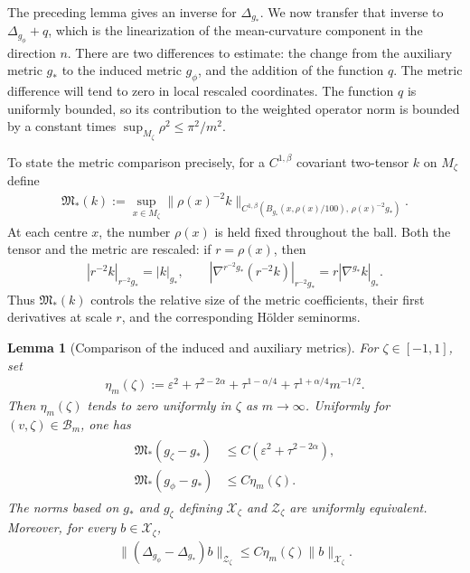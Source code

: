 \documentclass[a4paper,11pt,oneside,reqno]{amsart}
\numberwithin{equation}{section}
\newtheorem{lemma}[theorem]{Lemma}
\theoremstyle{definition}
\begin{document}
The preceding lemma gives an inverse for $\Delta_{g_*}$.
We now transfer that inverse to
$\Delta_{g_\phi}+q$, which is the linearization of the
mean-curvature component in the direction $n$.
There are two differences to estimate: the change from the
auxiliary metric $g_*$ to the induced metric $g_\phi$, and
the addition of the function $q$. The metric difference
will tend to zero in local rescaled coordinates. The
function $q$ is uniformly bounded, so its contribution to
the weighted operator norm is bounded by a constant times
$\sup_{M_\zeta}\rho^2\leq\pi^2/m^2$.

To state the metric comparison precisely, for a
$C^{1,\beta}$ covariant two-tensor $k$ on $M_\zeta$ define
%
\begin{align}
    \label{eq:s4-metric-comparison-norm}
    \mathfrak{M}_*(k)
    :=\sup_{x\in M_\zeta}
    \|\rho(x)^{-2}k\|_{C^{1,\beta}
    (B_{g_*}(x,\rho(x)/100),\,\rho(x)^{-2}g_*)}.
\end{align}
%
At each centre $x$, the number $\rho(x)$ is held fixed
throughout the ball. Both the tensor and the metric are
rescaled: if $r=\rho(x)$, then
%
\begin{align*}
    |r^{-2}k|_{r^{-2}g_*}=|k|_{g_*},
    \qquad
    |\nabla^{r^{-2}g_*}(r^{-2}k)|_{r^{-2}g_*}
    =r|\nabla^{g_*}k|_{g_*}.
\end{align*}
%
Thus $\mathfrak M_*(k)$ controls the relative size of the
metric coefficients, their first derivatives at scale $r$,
and the corresponding H\"older seminorms.

\begin{lemma}[Comparison of the induced and auxiliary metrics]
    \label{lem:s4-metric-comparison}
    For $\zeta\in[-1,1]$, set
    \begin{align}
        \label{eq:s4-comparison-smallness}
        \eta_m(\zeta)
        :=\varepsilon^2+\tau^{2-2\alpha}
        +\tau^{1-\alpha/4}
        +\tau^{1+\alpha/4}m^{-1/2}.
    \end{align}
    Then $\eta_m(\zeta)$ tends to zero uniformly in
    $\zeta$ as $m\to\infty$. Uniformly for
    $(v,\zeta)\in\mathcal B_m$, one has
    \begin{align}
        \label{eq:s4-metric-comparison}
        \begin{split}
            \mathfrak{M}_*(g_\zeta-g_*)
            &\leq C(\varepsilon^2+\tau^{2-2\alpha}),\\
            \mathfrak{M}_*(g_\phi-g_*)
            &\leq C\eta_m(\zeta).
        \end{split}
    \end{align}
    The norms based on $g_*$ and $g_\zeta$ defining
    $\mathcal X_\zeta$ and $\mathcal Z_\zeta$ are uniformly
    equivalent. Moreover, for every $b\in\mathcal X_\zeta$,
    \begin{align}
        \label{eq:s4-Laplacian-comparison}
        \| (\Delta_{g_\phi}-\Delta_{g_*})b\|_{\mathcal{Z}_\zeta}
        \leq C\eta_m(\zeta)\|b\|_{\mathcal{X}_\zeta}.
    \end{align}
\end{lemma}
\end{document}
